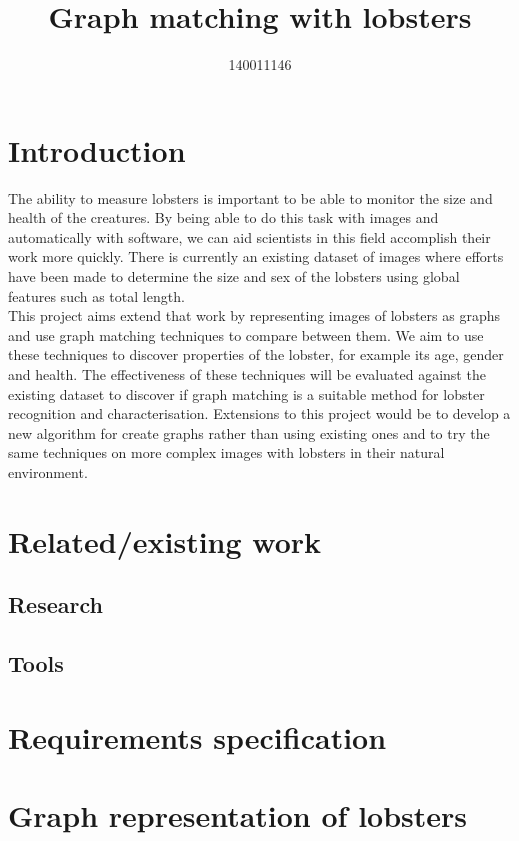 \documentclass{article}
\title{Graph matching with lobsters}
\author{140011146}
\newcommand{\n}[0]{\\[\baselineskip]}
\begin{document}
\maketitle

\tableofcontents

\section{Introduction}
The ability to measure lobsters is important to be able to monitor the size and health of the creatures. By being able to do this task with images and automatically with software, we can aid scientists in this field accomplish their work more quickly. There is currently an existing dataset of images where efforts have been made to determine the size and sex of the lobsters using global features such as total length.
\n
This project aims extend that work by representing images of lobsters as graphs and use graph matching techniques to compare between them. We aim to use these techniques to discover properties of the lobster, for example its age, gender and health. The effectiveness of these techniques will be evaluated against the existing dataset to discover if graph matching is a suitable method for lobster recognition and characterisation. Extensions to this project would be to develop a new algorithm for create graphs rather than using existing ones and to try the same techniques on more complex images with lobsters in their natural environment.


\section{Related/existing work}

\subsection{Research}

\subsection{Tools}

\section{Requirements specification}



\section{Graph representation of lobsters}
\end{document}
